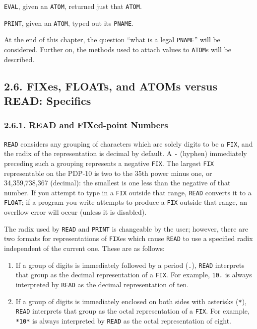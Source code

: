 \documentclass[a4paper,]{article}
\begin{document}
\texttt{EVAL}, given an \texttt{ATOM}, returned just that \texttt{ATOM}.

\texttt{PRINT}, given an \texttt{ATOM}, typed out its \texttt{PNAME}.

At the end of this chapter, the question ``what is a legal \texttt{PNAME}'' will be considered. Further on, the methods
used to attach values to \texttt{ATOM}s will be described.

\subsection{2.6. FIXes, FLOATs, and ATOMs versus READ: Specifics}\label{fixes-floats-and-atoms-versus-read-specifics}

\subsubsection{2.6.1. READ and FIXed-point Numbers}\label{read-and-fixed-point-numbers}

\texttt{READ} considers any grouping of characters which are solely digits to be a
\texttt{FIX}, and the radix of the representation is decimal by default. A \texttt{-} (hyphen)
immediately preceding such a grouping represents a negative \texttt{FIX}. The largest \texttt{FIX} representable on the
PDP-10 is two to the 35th power minus one, or 34,359,738,367 (decimal): the smallest is one less than the negative of that
number. If you attempt to type in a \texttt{FIX} outside that range, \texttt{READ} converts it to a \texttt{FLOAT}; if a
program you write attempts to produce a \texttt{FIX} outside that range, an overflow error will occur (unless it is
disabled).

The radix used by \texttt{READ} and \texttt{PRINT} is changeable by the user; however, there are two formats for
representations of \texttt{FIX}es which cause \texttt{READ} to use a specified radix independent of the current one. These
are as follows:

\begin{enumerate}
\def\labelenumi{\arabic{enumi}.}
\item
  If a group of digits is immediately followed by a period (\texttt{.}), \texttt{READ} interprets
  that group as the decimal representation of a \texttt{FIX}. For example, \texttt{10.} is always interpreted by
  \texttt{READ} as the decimal representation of ten.
\item
  If a group of digits is immediately enclosed on both sides with asterisks (\texttt{*}), 
  \texttt{READ} interprets that group as the octal representation of a \texttt{FIX}. For example, \texttt{*10*} is always
  interpreted by \texttt{READ} as the octal representation of eight.
\end{enumerate}
\end{document}
